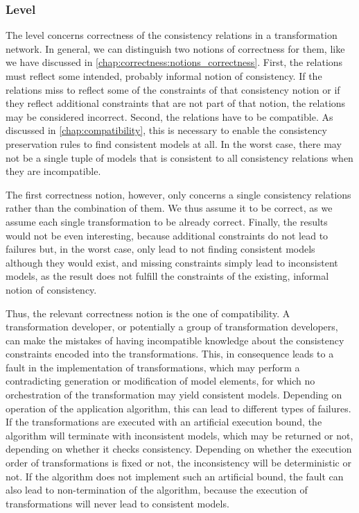\subsubsection*{\LevelNetworkRelation Level}

The \levelnetworkrelation level concerns correctness of the consistency relations in a transformation network.
In general, we can distinguish two notions of correctness for them, like we have discussed in \autoref{chap:correctness:notions_correctness}.
First, the relations must reflect some intended, probably informal notion of consistency.
If the relations miss to reflect some of the constraints of that consistency notion or if they reflect additional constraints that are not part of that notion, the relations may be considered incorrect.
Second, the relations have to be compatible.
As discussed in \autoref{chap:compatibility}, this is necessary to enable the consistency preservation rules to find consistent models at all.
In the worst case, there may not be a single tuple of models that is consistent to all consistency relations when they are incompatible.

The first correctness notion, however, only concerns a single consistency relations rather than the combination of them.
We thus assume it to be correct, as we assume each single transformation to be already correct.
Finally, the results would not be even interesting, because additional constraints do not lead to failures but, in the worst case, only lead to not finding consistent models although they would exist, and missing constraints simply lead to inconsistent models, as the result does not fulfill the constraints of the existing, informal notion of consistency.

Thus, the relevant correctness notion is the one of compatibility.
A transformation developer, or potentially a group of transformation developers, can make the mistakes of having incompatible knowledge about the consistency constraints encoded into the transformations.
This, in consequence leads to a fault in the implementation of transformations, which may perform a contradicting generation or modification of model elements, for which no orchestration of the transformation may yield consistent models.
Depending on operation of the application algorithm, this can lead to different types of failures.
If the transformations are executed with an artificial execution bound, the algorithm will terminate with inconsistent models, which may be returned or not, depending on whether it checks consistency.
Depending on whether the execution order of transformations is fixed or not, the inconsistency will be deterministic or not.
If the algorithm does not implement such an artificial bound, the fault can also lead to non-termination of the algorithm, because the execution of transformations will never lead to consistent models.


